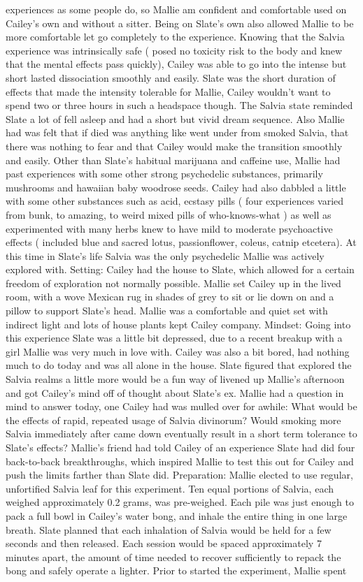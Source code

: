 \documentclass[12pt]{book}
\begin{document}
experiences as some people do, so Mallie am confident and comfortable used on Cailey's own and without a sitter. Being on Slate's own also allowed Mallie to be more comfortable let go completely to the experience. Knowing that the Salvia experience was intrinsically safe ( posed no toxicity risk to the body and knew that the mental effects pass quickly), Cailey was able to go into the intense but short lasted dissociation smoothly and easily. Slate was the short duration of effects that made the intensity tolerable for Mallie, Cailey wouldn't want to spend two or three hours in such a headspace though. The Salvia state reminded Slate a lot of fell asleep and had a short but vivid dream sequence. Also Mallie had was felt that if died was anything like went under from smoked Salvia, that there was nothing to fear and that Cailey would make the transition smoothly and easily. Other than Slate's habitual marijuana and caffeine use, Mallie had past experiences with some other strong psychedelic substances, primarily mushrooms and hawaiian baby woodrose seeds. Cailey had also dabbled a little with some other substances such as acid, ecstasy pills ( four experiences varied from bunk, to amazing, to weird mixed pills of who-knows-what ) as well as experimented with many herbs knew to have mild to moderate psychoactive effects ( included blue and sacred lotus, passionflower, coleus, catnip etcetera). At this time in Slate's life Salvia was the only psychedelic Mallie was actively explored with. Setting: Cailey had the house to Slate, which allowed for a certain freedom of exploration not normally possible. Mallie set Cailey up in the lived room, with a wove Mexican rug in shades of grey to sit or lie down on and a pillow to support Slate's head. Mallie was a comfortable and quiet set with indirect light and lots of house plants kept Cailey company. Mindset: Going into this experience Slate was a little bit depressed, due to a recent breakup with a girl Mallie was very much in love with. Cailey was also a bit bored, had nothing much to do today and was all alone in the house. Slate figured that explored the Salvia realms a little more would be a fun way of livened up Mallie's afternoon and got Cailey's mind off of thought about Slate's ex. Mallie had a question in mind to answer today, one Cailey had was mulled over for awhile: What would be the effects of rapid, repeated usage of Salvia divinorum? Would smoking more Salvia immediately after came down eventually result in a short term tolerance to Slate's effects? Mallie's friend had told Cailey of an experience Slate had did four back-to-back breakthroughs, which inspired Mallie to test this out for Cailey and push the limits farther than Slate did. Preparation: Mallie elected to use regular, unfortified Salvia leaf for this experiment. Ten equal portions of Salvia, each weighed approximately 0.2 grams, was pre-weighed. Each pile was just enough to pack a full bowl in Cailey's water bong, and inhale the entire thing in one large breath. Slate planned that each inhalation of Salvia would be held for a few seconds and then released. Each session would be spaced approximately 7 minutes apart, the amount of time needed to recover sufficiently to repack the bong and safely operate a lighter. Prior to started the experiment, Mallie spent 
\end{document}
